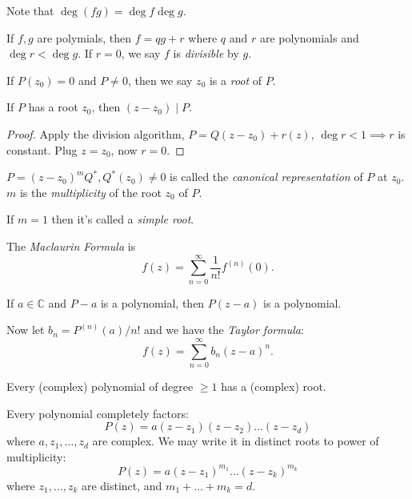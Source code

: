 Note that $\operatorname{deg} (fg) = \operatorname{deg} f \operatorname{deg} g$.

\begin{theorem}
	If $f,g$ are polymials, then $f = q g + r$ where $q$ and $r$ are polynomials and $\operatorname{deg}  r < \operatorname{deg} g$. If $r = 0$, we say $f$ is \textit{divisible} by $g$.
\end{theorem}

\begin{definition}[root]
	If $P(z_0) = 0$ and $P\neq 0$, then we say $z_0$ is a \textit{root} of $P$.
\end{definition}

\begin{proposition}
	If $P$ has a root $z_0$, then $(z-z_0) \mid P$.
\end{proposition}
\begin{proof}
Apply the division algorithm, $P = Q(z-z_0) + r(z)$, $\operatorname{deg} r < 1 \implies r $ is constant. Plug $z = z_0$, now $r = 0$. 
\end{proof}

$P = (z - z_0)^m Q^*, Q^*(z_0) \neq  0$ is called the \textit{canonical representation} of $P$ at $z_0$. $m$ is the \textit{multiplicity} of the root $z_0$ of $P$.

If $m = 1$ then it's called a \textit{simple root}.

\begin{definition}
	The \textit{Maclaurin Formula} is \[
		f(z) = \sum_{n=0}^{\infty} \frac{1}{n!}f^{(n)}(0)
	.\] 
\end{definition}

\begin{proposition}
	If $a \in \mathbb{C}$ and $P - a$ is a polynomial, then $P(z-a)$ is a polynomial.
\end{proposition}
Now let $b_n = P^{(n)}(a) / n!$ and we have the \textit{Taylor formula}: \[
	f(z) = \sum_{n=0}^{\infty} b_n (z-a)^n
.\] 

\begin{theorem}
	Every (complex) polynomial of degree $\ge 1$ has a (complex) root.
\end{theorem}
\begin{corollary}
	Every polynomial completely factors: \[
		P(z) = a(z-z_1)(z-z_2)\ldots(z-z_d)
	\] where $a, z_1, \ldots, z_d$ are complex. 
	We may write it in distinct roots to power of multiplicity:
	\[
		P(z) = a(z-z_1)^{m_1}\ldots(z-z_k)^{m_k}
	\] where $z_1, \ldots, z_k$ are distinct, and $m_1 + \ldots + m_k = d$.
\end{corollary}

